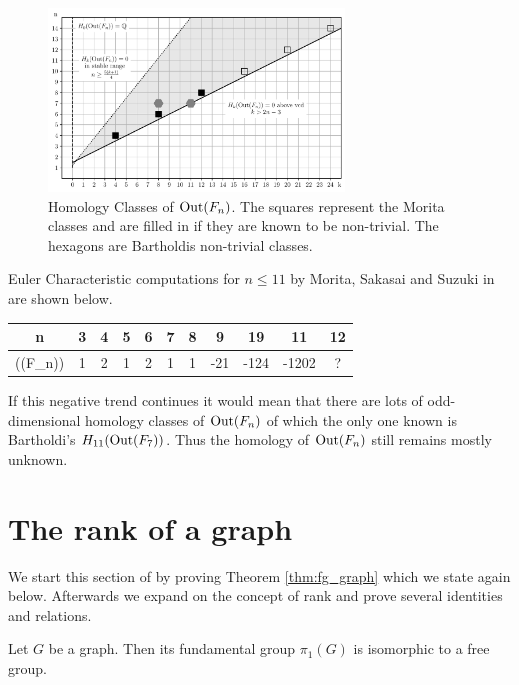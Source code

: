 \begin{figure}[htbp]
	\centering
	\captionsetup{width=0.8\textwidth}
	\includegraphics[width=0.7\textwidth]{./Images/OutFnHomology.pdf}
	\caption{Homology Classes of $\operatorname{Out}(F_{n})$. The squares represent the  Morita classes and are filled in if they are known to be non-trivial.
		The hexagons are Bartholdis non-trivial classes.}
\end{figure}

Euler Characteristic computations for $n \leq 11$ by Morita, Sakasai and Suzuki in \cite{morita15moduli,morita15euler} are shown below.
\begin{table}[htpb]
	\centering
	\begin{tabular}{C|C|C|C|C|C|C|C|C|C|C}
		n & 3 & 4 & 5 & 6 & 7 & 8 & 9 & 19 & 11 & 12\\ \hline
		\chi(\out(F_{n})) & 1 & 2 & 1 & 2 & 1 & 1 & -21 & -124 & -1202 & ?
	\end{tabular}
\end{table}
If this negative trend continues it would mean that there are lots of odd-dimensional
homology classes of $\operatorname{Out}(F_{n})$ of which the only one known is Bartholdi's $H_{11}(\operatorname{Out}(F_{7}))$.
Thus the homology of $\operatorname{Out}(F_{n})$ still remains mostly unknown.

\newpage


\section{The rank of a graph}\label{sec:RankGraph}
We start this section of by proving Theorem \ref{thm:fg_graph} which we state again below.
Afterwards we expand on the concept of rank and prove several identities and relations.

\begin{theorem}
	Let $G$ be a graph. Then its fundamental group $\pi_{1}(G)$ is isomorphic to a free group.
\end{theorem}

